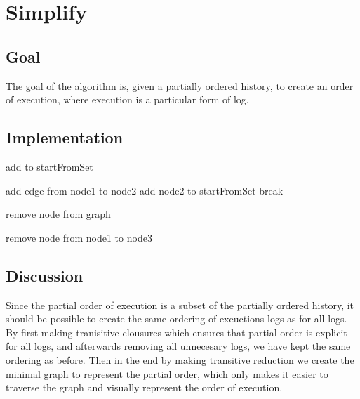 \section{Simplify}
\subsection{Goal} %
The goal of the algorithm is, given a partially ordered history, to create an order of execution, where execution is a particular form of log.

\subsection{Implementation} %
\begin{algorithmic}
	\State {}
		    \State add to startFromSet
		\EndIf
	\EndFor
	
	\State {}
	            \State add edge from node1 to node2
	            \State add node2 to startFromSet
	            \State break
	        \EndIf
	    \EndFor
	\EndFor
	
	\State {}
	        \State remove node from graph
	    \EndIf
	\EndFor
	      
	\State {}
	          \State remove node from node1 to node3
	        \EndIf
	      \EndFor
	    \EndIf
	  \EndFor
	\EndFor
\end{algorithmic}
\subsection{Discussion} %
Since the partial order of execution is a subset of the partially ordered history, it should be possible to create the same ordering of exeuctions logs as for all logs. By first making tranisitive clousures which ensures that partial order is explicit for all logs, and afterwards removing all unnecesary logs, we have kept the same ordering as before. Then in the end by making transitive reduction we create the minimal graph to represent the partial order, which only makes it easier to traverse the graph and visually represent the order of execution.

